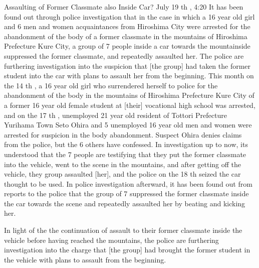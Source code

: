 \par{Assaulting of Former Classmate also Inside Car? \hfill\break
July 19 th , 4:20 \hfill\break
It has been found out through police investigation that in the case in which a 16 year old girl and 6 men and women acquaintances from Hiroshima City were arrested for the abandonment of the body of a former classmate in the mountains of Hiroshima Prefecture Kure City, a group of 7 people inside a car towards the mountainside suppressed the former classmate, and repeatedly assaulted her. The police are furthering investigation into the suspicion that [the group] had taken the former student into the car with plans to assault her from the beginning. \hfill\break
This month on the 14 th , a 16 year old girl who surrendered herself to police for the abandonment of the body in the mountains of Hiroshima Prefecture Kure City of a former 16 year old female student at [their] vocational high school was arrested, and on the 17 th , unemployed 21 year old resident of Tottori Prefecture Yurihama Town Seto Ohira and 5 unemployed 16 year old men and women were arrested for suspicion in the body abandonment. \hfill\break
Suspect Ohira denies claims from the police, but the 6 others have confessed. \hfill\break
In investigation up to now, it\textquotesingle s understood that the 7 people are testifying that they put the former classmate into the vehicle, went to the scene in the mountains, and after getting off the vehicle, they group assaulted [her], and the police on the 18 th seized the car thought to be used. In police investigation afterward, it has been found out from reports to the police that the group of 7 suppressed the former classmate inside the car towards the scene and repeatedly assaulted her by beating and kicking her. }

\par{In light of the the continuation of assault to their former classmate inside the vehicle before having reached the mountains, the police are furthering investigation into the charge that [the group] had brought the former student in the vehicle with plans to assault from the beginning. }
    